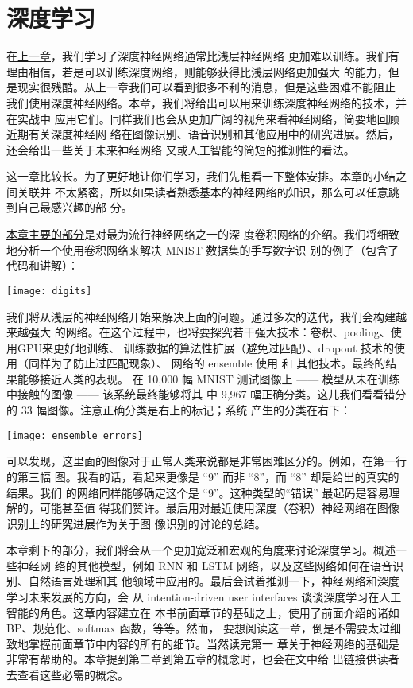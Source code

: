 
\chapter{深度学习}
\label{ch:Deeplearning}

在\hyperref[ch:WhyHardToTrain]{上一章}，我们学习了深度神经网络通常比浅层神经网络
更加难以训练。我们有理由相信，若是可以训练深度网络，则能够获得比浅层网络更加强大
的能力，但是现实很残酷。从上一章我们可以看到很多不利的消息，但是这些困难不能阻止
我们使用深度神经网络。本章，我们将给出可以用来训练深度神经网络的技术，并在实战中
应用它们。同样我们也会从更加广阔的视角来看神经网络，简要地回顾近期有关深度神经网
络在图像识别、语音识别和其他应用中的研究进展。然后，还会给出一些关于未来神经网络
又或人工智能的简短的推测性的看法。

这一章比较长。为了更好地让你们学习，我们先粗看一下整体安排。本章的小结之间关联并
不太紧密，所以如果读者熟悉基本的神经网络的知识，那么可以任意跳到自己最感兴趣的部
分。

\hyperref[sec:convolutional_networks]{本章主要的部分}是对最为流行神经网络之一的深
度卷积网络的介绍。我们将细致地分析一个使用卷积网络来解决 MNIST 数据集的手写数字识
别的例子（包含了代码和讲解）：
\begin{center}
  \texttt{[image: digits]}
\end{center}

我们将从浅层的神经网络开始来解决上面的问题。通过多次的迭代，我们会构建越来越强大
的网络。在这个过程中，也将要探究若干强大技术：卷积、pooling、使用GPU来更好地训练、
训练数据的算法性扩展（避免过匹配）、dropout 技术的使用（同样为了防止过匹配现象）、
网络的 ensemble 使用 和 其他技术。最终的结果能够接近人类的表现。
在 10,000 幅 MNIST 测试图像上 —— 模型从未在训练中接触的图像 —— 该系统最终能够将其
中 9,967 幅正确分类。这儿我们看看错分的 33 幅图像。注意正确分类是右上的标记；系统
产生的分类在右下：
\begin{center}
  \texttt{[image: ensemble\_errors]}
\end{center}

可以发现，这里面的图像对于正常人类来说都是非常困难区分的。例如，在第一行的第三幅
图。我看的话，看起来更像是 “9” 而非 “8”，而 “8” 却是给出的真实的结果。我们
的网络同样能够确定这个是 “9”。这种类型的“错误” 最起码是容易理解的，可能甚至值
得我们赞许。最后用对最近使用深度（卷积）神经网络在图像识别上的研究进展作为关于图
像识别的讨论的总结。

本章剩下的部分，我们将会从一个更加宽泛和宏观的角度来讨论深度学习。概述一些神经网
络的其他模型，例如 RNN 和 LSTM 网络，以及这些网络如何在语音识别、自然语言处理和其
他领域中应用的。最后会试着推测一下，神经网络和深度学习未来发展的方向，会
从 intention-driven user interfaces 谈谈深度学习在人工智能的角色。这章内容建立在
本书前面章节的基础之上，使用了前面介绍的诸如 BP、规范化、softmax 函数，等等。然而，
要想阅读这一章，倒是不需要太过细致地掌握前面章节中内容的所有的细节。当然读完第一
章关于神经网络的基础是非常有帮助的。本章提到第二章到第五章的概念时，也会在文中给
出链接供读者去查看这些必需的概念。

